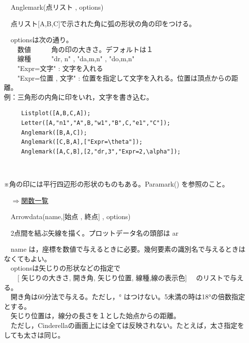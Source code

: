\documentclass[papersize,a4paper,12pt,uplatex]{jsarticle}
\begin{document}
\newpage
\begin{description}

\hypertarget{anglemark}{}
\item[関数]　Anglemark(点リスト , options)
\item[機能]　点リスト[A,B,C]で示された角に弧の形状の角の印をつける。
\item[説明]　optionsは次の通り。\\
　　数値　　　角の印の大きさ。デフォルトは１\\
　　線種　　　"dr, n"  , "da,m,n" , "do,m,n"\\
　　"Expr=文字"  : 文字を入れる\\
　　"Expr=位置 , 文字"  : 位置を指定して文字を入れる。位置は頂点からの距離。\\

例：三角形の内角に印をいれ，文字を書き込む。
\begin{verbatim}
　　　Listplot([A,B,C,A]);
　　　Letter([A,"n1","A",B,"w1","B",C,"e1","C"]);
　　　Anglemark([B,A,C]);
　　　Anglemark([C,B,A],["Expr=\theta"]);
　　　Anglemark([A,C,B],[2,"dr,3","Expr=2,\alpha"]);
\end{verbatim}
　

※角の印には平行四辺形の形状のものもある。Paramark() を参照のこと。\\

\begin{flushright}　\hyperlink{functionlist}{$\Rightarrow$関数一覧}\end{flushright}

\hypertarget{arrowdata}{}
\item[関数]　Arrowdata(name,[始点 , 終点] , options) 
\item[機能]　2点間を結ぶ矢線を描く。プロットデータ名の頭部は ar
\item[説明]　name は，座標を数値で与えるときに必要。幾何要素の識別名で与えるときはなくてもよい。\\
　optionsは矢じりの形状などの指定で\\
　　[ 矢じりの大きさ, 開き角, 矢じり位置, 線種,線の表示色] 
　のリストで与える。\\
　開き角は60分法で与える。ただし，° はつけない。5未満の時は18°の倍数指定とする。\\
　矢じり位置は，線分の長さを１とした始点からの距離。\\
　ただし，Cinderellaの画面上には全ては反映されない。たとえば，太さ指定をしても太さは同じ。\\


\end{description}
\end{document}
